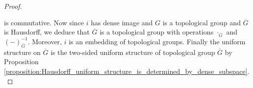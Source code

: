 \documentclass[10pt]{amsart}
\begin{document}
\begin{proof}
\begin{center}
	\end{center}
	is commutative. Now since $i$ has dense image and $G$ is a topological group and $\overline{G}$ is Hausdorff, we deduce that $\overline{G}$ is a topological group with operations $\cdot_{\overline{G}}$ and $(-)^{-1}_{\overline{G}}$. Moreover, $i$ is an embedding of topological groups. Finally the uniform structure on $\overline{G}$ is the two-sided uniform structure of topological group $\overline{G}$ by Proposition \ref{proposition:Hausdorff_uniform_structure_is_determined_by_dense_subspace}.



\end{proof}





















\small


\end{document}
